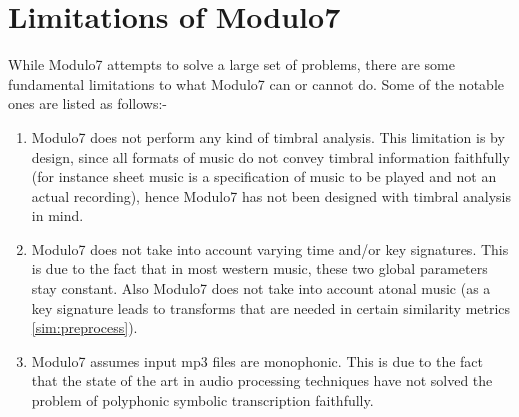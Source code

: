 \section{Limitations of Modulo7}  \label{limitations}

\noindent While Modulo7 attempts to solve a large set of problems, there are some fundamental limitations to what Modulo7 can or cannot do. Some of the notable ones are listed as follows:-

\begin{enumerate}
\item Modulo7 does not perform any kind of timbral analysis. This limitation is by design, since all formats of music do not convey timbral information faithfully (for instance sheet music is a specification of music to be played and not an actual recording), hence Modulo7 has not been designed with timbral analysis in mind.
\item Modulo7 does not take into account varying time and/or key signatures. This is due to the fact that in most western music, these two global parameters stay constant. Also Modulo7 does not take into account atonal music (as a key signature leads to transforms that are needed in certain similarity metrics \ref{sim:preprocess}). 
\item Modulo7 assumes input mp3 files are monophonic. This is due to the fact that the state of the art in audio processing techniques have not solved the problem of polyphonic symbolic transcription faithfully. \cite{melextract}
\end{enumerate}
